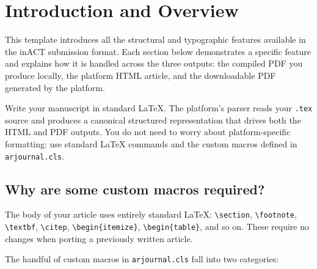 


\makearjtitle   %

\section{Introduction and Overview}

This template introduces all the structural and typographic features
available in the inACT submission format. Each section below
demonstrates a specific feature and explains how it is handled across
the three outputs: the compiled PDF you produce locally, the platform HTML
article, and the downloadable PDF generated by the platform.

Write your manuscript in standard LaTeX. The platform's parser reads your
\texttt{.tex} source and produces a canonical structured representation
that drives both the HTML and PDF outputs. You do not need to worry about
platform-specific formatting: use standard LaTeX commands and the custom
macros defined in \texttt{arjournal.cls}.

\subsection*{Why are some custom macros required?}

The body of your article uses entirely standard LaTeX: \verb|\section|,
\verb|\footnote|, \verb|\textbf|, \verb|\citep|, \verb|\begin{itemize}|,
\verb|\begin{table}|, and so on. These require no changes when porting a
previously written article.

The handful of custom macros in \texttt{arjournal.cls} fall into two
categories:

